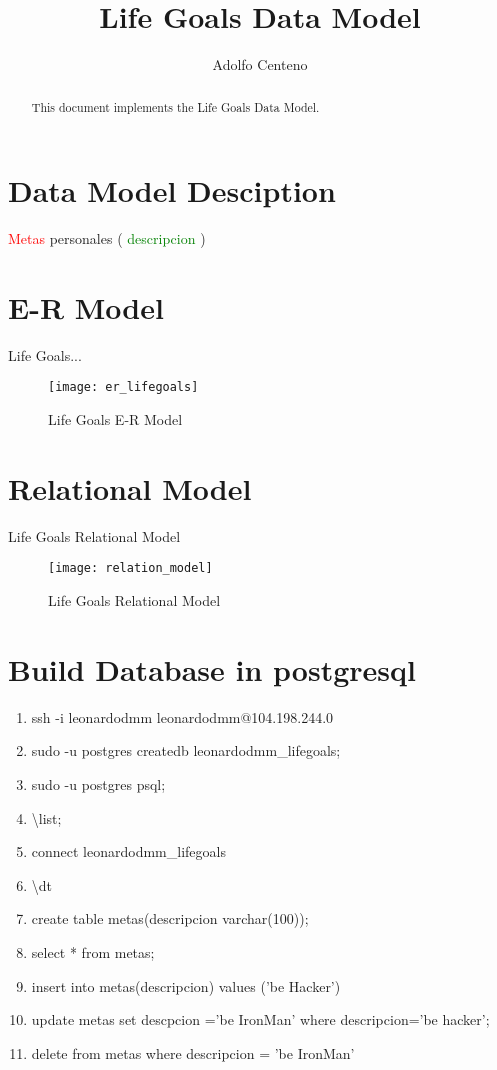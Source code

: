 \documentclass[10pt]{article}         %
\title{Life Goals Data Model}
\author{Adolfo Centeno}
\begin{document}
\maketitle

\begin{abstract}
This document implements the Life Goals Data Model.
\end{abstract}

\section{Data Model Desciption}


\textcolor{red}{Metas} personales ( \textcolor{green}{descripcion} )



\section{E-R Model}

Life Goals...

\begin{figure}[h]
     \texttt{[image: er\_lifegoals]}
     \caption{Life Goals E-R Model}
\end{figure}
   
\section{Relational Model}
Life Goals Relational Model

\begin{figure}[h]
     \texttt{[image: relation\_model]}
     \caption{Life Goals Relational Model}
\end{figure}

\section{Build Database in postgresql}
\begin{enumerate}
	\item
	ssh -i leonardodmm leonardodmm@104.198.244.0
	\item 
	sudo -u postgres createdb leonardodmm\_lifegoals;
	\item
	sudo -u postgres psql;
	\item
	\textbackslash list;
	\item
	connect leonardodmm\_lifegoals
	\item
	\textbackslash dt
	\item
	create table metas(descripcion varchar(100));
	\item
	select * from metas;
	\item
	insert into metas(descripcion) values ('be Hacker')
	\item
	update metas set descpcion ='be IronMan' where descripcion='be hacker';
	\item
	delete from metas where descripcion = 'be IronMan'
\end{enumerate}
\end{document}
